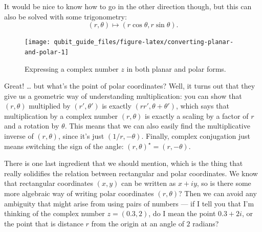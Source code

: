\documentclass[fleqn,a4paper]{article}
\renewcommand{\footnote}[1]{\sidenotetext[{\color{white}0}\!\!]{\footnotesize #1}}
\theoremstyle{definition}
\theoremstyle{definition}
\theoremstyle{definition}
\theoremstyle{definition}
\theoremstyle{remark}
\begin{document}
It would be nice to know how to go in the other direction though, but this can also be solved with some trigonometry:
\[
  (r,\theta)
  \longmapsto (r\cos\theta,r\sin\theta).
\]



\begin{figure}[H]

{\centering \texttt{[image: qubit\_guide\_files/figure-latex/converting-planar-and-polar-1]} 

}

\caption{Expressing a complex number \(z\) in both planar and polar forms.}\label{fig:converting-planar-and-polar}
\end{figure}

Great!
\ldots{} but what's the point of polar coordinates?
Well, it turns out that they give us a geometric way of understanding multiplication: you can show\footnote{\textbf{Exercise.} Prove this!} that \((r,\theta)\) multiplied by \((r',\theta')\) is exactly \((rr',\theta+\theta')\), which says that multiplication by a complex number \((r,\theta)\) is exactly a scaling by a factor of \(r\) and a rotation by \(\theta\).
This means that we can also easily find the multiplicative inverse of \((r,\theta)\), since it's just \((1/r,-\theta)\).
Finally, complex conjugation just means switching the sign of the angle: \((r,\theta)^\star=(r,-\theta)\).

There is one last ingredient that we should mention, which is the thing that really solidifies the relation between rectangular and polar coordinates.
We know that rectangular coordinates \((x,y)\) can be written as \(x+iy\), so is there some more algebraic way of writing polar coordinates \((r,\theta)\)?
Then we can avoid any ambiguity that might arise from using pairs of numbers --- if I tell you that I'm thinking of the complex number \(z=(0.3,2)\), do I mean the point \(0.3+2i\), or the point that is distance \(r\) from the origin at an angle of \(2\) radians?
\end{document}
